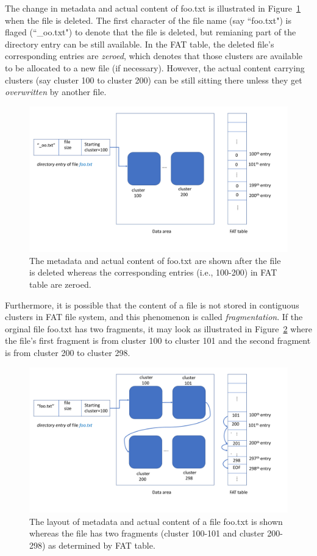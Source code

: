 The change in metadata and actual content of foo.txt is illustrated in Figure~\ref{fig:fat2} when the file is deleted.
The first character of the file name (say ``foo.txt") is flaged (``\_oo.txt") to denote that the file is deleted, 
but remianing part of the directory entry can be still available. In the FAT table, the deleted file's corresponding
entries are \emph{zeroed}, which denotes that those clusters are available to be allocated to a new file (if necessary).
However, the actual content carrying clusters (say cluster 100 to cluster 200)
can be still sitting there unless they get \emph{overwritten} by another file. 
  
\begin{figure}[h]
    \centering
    \includegraphics[width=\linewidth]{fig/fat2.pdf}
    \caption{The metadata and actual content of foo.txt are shown after the file is deleted whereas the corresponding entries (i.e., 100-200) in FAT table are zeroed.}
    \label{fig:fat2}
\end{figure}

Furthermore, it is possible that the content of a file is not stored in contiguous clusters in FAT file system, 
and this phenomenon is called \emph{fragmentation}.
If the orginal file foo.txt has two fragments, it may look as illustrated in Figure~\ref{fig:fat3} where the file's first fragment is from cluster 100 to cluster 101 and the 
second fragment is from cluster 200 to cluster 298. 

\begin{figure}[h]
    \centering
    \includegraphics[width=\linewidth]{fig/fat3.pdf}
    \caption{The layout of metadata and actual content of a file foo.txt is shown whereas the file has two fragments (cluster 100-101 and cluster 200-298) 
as determined by FAT table.}
    \label{fig:fat3}
\end{figure}
